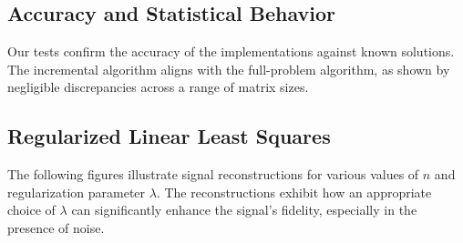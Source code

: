 \documentclass{article}
\begin{document}
\subsection{Accuracy and Statistical Behavior}
Our tests confirm the accuracy of the implementations against known solutions. The incremental algorithm aligns with the full-problem algorithm, as shown by negligible discrepancies across a range of matrix sizes.

\subsection{Regularized Linear Least Squares}
The following figures illustrate signal reconstructions for various values of $n$ and regularization parameter $\lambda$. The reconstructions exhibit how an appropriate choice of $\lambda$ can significantly enhance the signal's fidelity, especially in the presence of noise.
\end{document}
